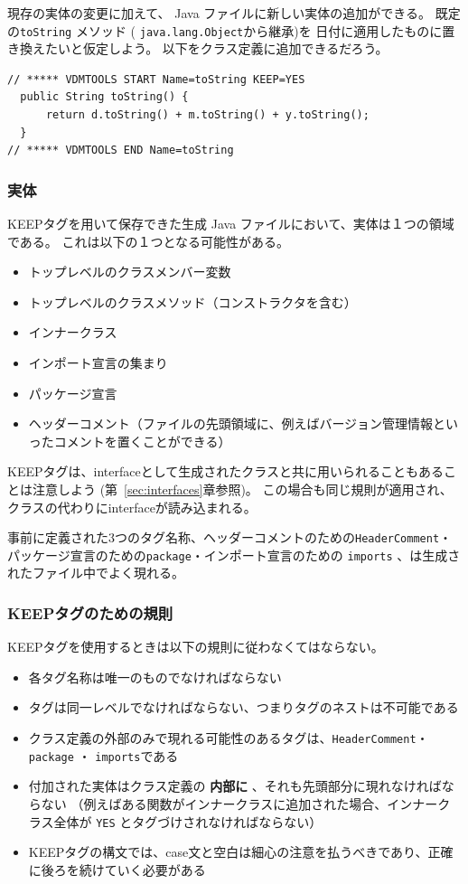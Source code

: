 \documentclass[\pformat,11pt]{jarticle}
\begin{document}
現存の実体の変更に加えて、 Java ファイルに新しい実体の追加ができる。 
既定の\texttt{toString} メソッド ( \texttt{java.lang.Object}から継承)を
日付に適用したものに置き換えたいと仮定しよう。
以下をクラス定義に追加できるだろう。
\begin{screen}
\begin{verbatim}
// ***** VDMTOOLS START Name=toString KEEP=YES
  public String toString() {
      return d.toString() + m.toString() + y.toString();
  }
// ***** VDMTOOLS END Name=toString
\end{verbatim}
\end{screen}

\subsubsection{実体}

KEEPタグを用いて保存できた生成 Java ファイルにおいて、実体は１つの領域である。
これは以下の１つとなる可能性がある。

\begin{itemize}
\item トップレベルのクラスメンバー変数
\item トップレベルのクラスメソッド（コンストラクタを含む）
\item インナークラス
\item インポート宣言の集まり
\item パッケージ宣言
\item ヘッダーコメント（ファイルの先頭領域に、例えばバージョン管理情報といったコメントを置くことができる）
\end{itemize}
KEEPタグは、interfaceとして生成されたクラスと共に用いられることもあることは注意しよう
(第~\ref{sec:interfaces}章参照)。
この場合も同じ規則が適用され、クラスの代わりにinterfaceが読み込まれる。

事前に定義された3つのタグ名称、ヘッダーコメントのための\texttt{HeaderComment}・
パッケージ宣言のための\texttt{package}・インポート宣言のための \texttt{imports} 、は生成されたファイル中でよく現れる。

\subsubsection{KEEPタグのための規則}

KEEPタグを使用するときは以下の規則に従わなくてはならない。 

\begin{itemize}
\item 各タグ名称は唯一のものでなければならない
\item タグは同一レベルでなければならない、つまりタグのネストは不可能である
\item クラス定義の外部のみで現れる可能性のあるタグは、\texttt{HeaderComment}・ \texttt{package} ・ \texttt{imports}である
\item 付加された実体はクラス定義の \textbf{内部に} 、それも先頭部分に現れなければならない
（例えばある関数がインナークラスに追加された場合、インナークラス全体が \texttt{YES} とタグづけされなければならない）
\item KEEPタグの構文では、case文と空白は細心の注意を払うべきであり、正確に後ろを続けていく必要がある
\end{itemize}
\end{document}
